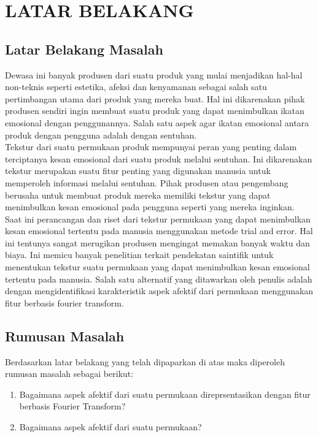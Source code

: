 
\chapter{LATAR BELAKANG}

\section{Latar Belakang Masalah}
Dewasa ini banyak produsen dari suatu produk yang mulai menjadikan hal-hal non-teknis seperti estetika, afeksi dan kenyamanan sebagai salah satu pertimbangan utama dari produk yang mereka buat. Hal ini dikarenakan pihak produsen sendiri ingin membuat suatu produk yang dapat menimbulkan ikatan emosional dengan penggunannya. Salah satu aspek agar ikatan emosional antara produk dengan pengguna adalah dengan sentuhan.\\
\indent Tekstur dari suatu permukaan produk mempunyai peran yang penting dalam terciptanya kesan emosional dari suatu produk melalui sentuhan. Ini dikarenakan tekstur merupakan suatu fitur penting yang digunakan manusia untuk memperoleh informasi melalui sentuhan. Pihak produsen atau pengembang berusaha untuk membuat produk mereka memiliki tekstur yang dapat menimbulkan kesan emosional pada pengguna seperti yang mereka inginkan. \\
\indent Saat ini perancangan dan riset dari tekstur permukaan yang dapat menimbulkan kesan emosional tertentu pada manusia menggunakan metode trial and error. Hal ini tentunya sangat merugikan produsen mengingat memakan banyak waktu dan biaya. Ini memicu banyak penelitian terkait pendekatan saintifik untuk menentukan tekstur suatu permukaan yang dapat menimbulkan kesan emosional tertentu pada manusia. Salah satu alternatif yang ditawarkan oleh penulis adalah dengan mengidentifikasi karakteristik aspek afektif dari permukaan menggunakan fitur berbasis fourier transform. 

\section{Rumusan Masalah}
\indent Berdasarkan latar belakang yang telah dipaparkan di atas maka diperoleh rumusan masalah sebagai berikut:
\begin{enumerate}
	\item Bagaimana aspek afektif dari suatu permukaan direprsentasikan dengan fitur berbasis Fourier Transform?
	\item Bagaimana aspek afektif dari suatu permukaan?
\end{enumerate}


